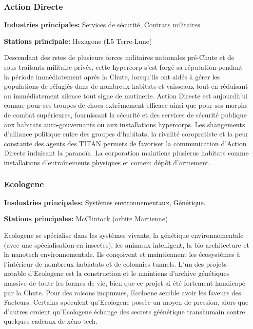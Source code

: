 \subsubsection{Action Directe} \label{sec:direct-action} 

\textbf{Industries principales:} Services de sécurité, Contrats militaires 

\textbf{Stations principale:} Hexagone (L5 Terre-Lune) 

Descendant des rstes de plusieurs forces militaires nationales pré-Chute et de sous-traitants militaire privés, cette hypercorp s'est forgé sa réputation pendant la période immédiatement après la Chute, lorsqu'ils ont aidés à gérer les populations de réfugiés dans de nombreux habitats et vaisseaux tout en réduisant au immédiatement silence tout signe de mutinerie. Action Directe est aujourdh'ui connue pour ses troupes de chocs extrêmement efficace ainsi que pour ses morphs de combat supérieures, fournissant la sécurité et des services de sécurité publique aux habitats auto-gouvernants ou aux installations hypercorps. Les shangements d'alliance politique entre des groupes d'habitats, la rivalité coropratiste et la peur constante des agents des TITAN permets de favoriser la communication d'Action Directe induisant la paranoïa. La corporation maintiens plusierus habitats comme installations d'entraînements physiques et comem dépôt d'armement. 

\subsubsection{Ecologene} \label{sec:ecologene} 

\textbf{Insdustries principales:} Systèmes environnementaux, Génétique. 

\textbf{Stations principales:} McClintock (orbite Martienne) 

Ecologene se spécialise dans les systèmes vivants, la génétique environnementale (avec une spécialisation en insectes), les animaux intelligent, la bio architecture et la nanotech environnementale. Ils conçoivent et maintiennent les écosystèmes à l'intérieur de nombreux habiatats et de colonnies tunnels. L'un des projets notable d'Ecologene est la construction et le maintiens d'archive génétiques massive de toute les formes de vie, bien que ce projet ai été fortement handicapé par la Chute. Pour des raisons incpnnues, Ecoloene semble avoir les faveurs des Facteurs. Certains spéculent qu'Ecologene possèe un moyen de pression, alors que d'autres croient qu'Ecologene échange des secrets géénétique transhumain contre quelques cadeaux de xéno-tech. 

